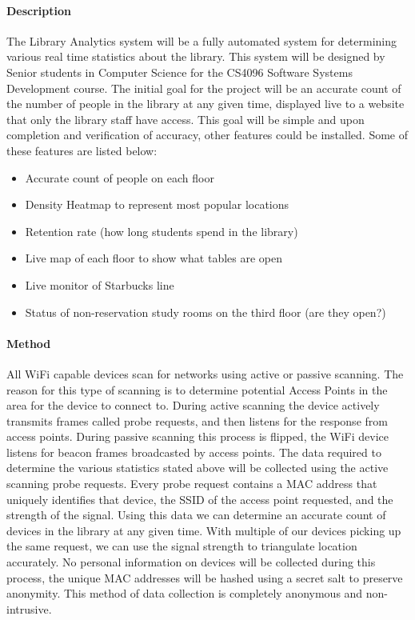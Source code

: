 \documentclass[12pt]{article}
\begin{document}
\maketitle
\paragraph{Description}
The Library Analytics system will be a fully automated system for determining various real time statistics about the library.  This system will be designed by Senior students in Computer Science for the CS4096 Software Systems Development course.  The initial goal for the project will be an accurate count of the number of people in the library at any given time, displayed live to a website that only the library staff have access.  This goal will be simple and upon completion and verification of accuracy, other features could be installed.  Some of these features are listed below:
\begin{itemize}
  \item Accurate count of people on each floor
  \item Density Heatmap to represent most popular locations
  \item Retention rate (how long students spend in the library)
  \item Live map of each floor to show what tables are open
  \item Live monitor of Starbucks line
  \item Status of non-reservation study rooms on the third floor (are they open?)
\end{itemize}


\paragraph{Method}
All WiFi capable devices scan for networks using active or passive scanning.  The reason for this type of scanning is to determine potential Access Points in the area for the device to connect to.  During active scanning the device actively transmits frames called probe requests, and then listens for the response from access points.  During passive scanning this process is flipped, the WiFi device listens for beacon frames broadcasted by access points.  The data required to determine the various statistics stated above will be collected using the active scanning probe requests.  Every probe request contains a MAC address that uniquely identifies that device, the SSID of the access point requested, and the strength of the signal.  Using this data we can determine an accurate count of devices in the library at any given time.  With multiple of our devices picking up the same request, we can use the signal strength to triangulate location accurately.  No personal information on devices will be collected during this process, the unique MAC addresses will be hashed using a secret salt to preserve anonymity. This method of data collection is completely anonymous and non-intrusive. 
\end{document}
